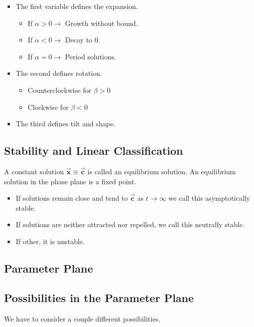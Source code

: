 \documentclass[12pt,landscape,twocolumn]{article}
\let\oldvec\vec
\renewcommand{\vec}[1]{\oldvec{\mathbf{ #1 } } }                    %
\begin{document}
        \begin{itemize}
            \item The first variable defines the expansion.
                \begin{itemize}
                    \item If $\alpha > 0 \to$ Growth without bound.
                    \item If $\alpha < 0 \to$ Decay to $0$.
                    \item If $\alpha = 0 \to$ Period solutions.
                \end{itemize}
            \item The second defines rotation.
                \begin{itemize}
                    \item Counterclockwise for $\beta > 0$
                    \item Clockwise for $\beta < 0$
                \end{itemize}
            \item The third defines tilt and shape.
        \end{itemize}

    \subsection{Stability and Linear Classification}
    A constant solution $\vec{x} \equiv \vec{c}$ is called an equilibrium solution. An equilibrium solution in the phase plane is a fixed point.

        \begin{itemize}
            \item If solutions remain close and tend to $\vec{c}$ as $t \to \infty$ we call this asymptotically stable.
            \item If solutions are neither attracted nor repelled, we call this neutrally stable.
            \item If other, it is unstable.
        \end{itemize}

    \subsection{Parameter Plane}

    \subsection{Possibilities in the Parameter Plane}
    We have to consider a couple different possibilities.
\end{document}
